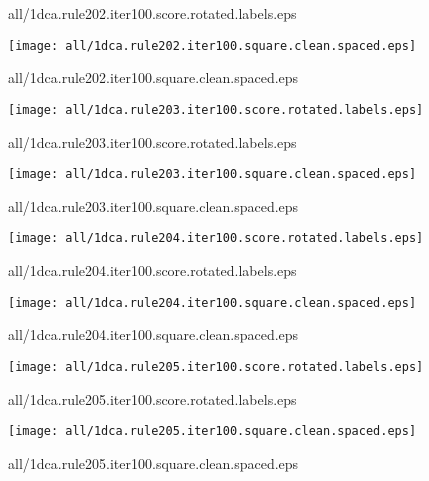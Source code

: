 \documentclass{article}
\begin{document}
{\footnotesize all/1dca.rule202.iter100.score.rotated.labels.eps}
\begin{center}
\begin{minipage}{\textwidth}
\texttt{[image: all/1dca.rule202.iter100.square.clean.spaced.eps]}
\end{minipage}
\end{center}
{\footnotesize all/1dca.rule202.iter100.square.clean.spaced.eps}
\begin{center}
\begin{minipage}{\textwidth}
\texttt{[image: all/1dca.rule203.iter100.score.rotated.labels.eps]}
\end{minipage}
\end{center}
{\footnotesize all/1dca.rule203.iter100.score.rotated.labels.eps}
\begin{center}
\begin{minipage}{\textwidth}
\texttt{[image: all/1dca.rule203.iter100.square.clean.spaced.eps]}
\end{minipage}
\end{center}
{\footnotesize all/1dca.rule203.iter100.square.clean.spaced.eps}
\begin{center}
\begin{minipage}{\textwidth}
\texttt{[image: all/1dca.rule204.iter100.score.rotated.labels.eps]}
\end{minipage}
\end{center}
{\footnotesize all/1dca.rule204.iter100.score.rotated.labels.eps}
\begin{center}
\begin{minipage}{\textwidth}
\texttt{[image: all/1dca.rule204.iter100.square.clean.spaced.eps]}
\end{minipage}
\end{center}
{\footnotesize all/1dca.rule204.iter100.square.clean.spaced.eps}
\begin{center}
\begin{minipage}{\textwidth}
\texttt{[image: all/1dca.rule205.iter100.score.rotated.labels.eps]}
\end{minipage}
\end{center}
{\footnotesize all/1dca.rule205.iter100.score.rotated.labels.eps}
\begin{center}
\begin{minipage}{\textwidth}
\texttt{[image: all/1dca.rule205.iter100.square.clean.spaced.eps]}
\end{minipage}
\end{center}
{\footnotesize all/1dca.rule205.iter100.square.clean.spaced.eps}
\end{document}
